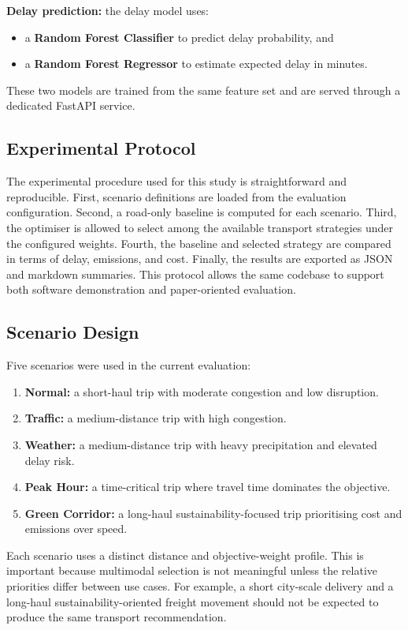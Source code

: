 \textbf{Delay prediction:} the delay model uses:
\begin{itemize}
    \item a \textbf{Random Forest Classifier} to predict delay probability, and
    \item a \textbf{Random Forest Regressor} to estimate expected delay in minutes.
\end{itemize}
These two models are trained from the same feature set and are served through a dedicated FastAPI service.

\subsection{Experimental Protocol}
The experimental procedure used for this study is straightforward and reproducible. First, scenario definitions are loaded from the evaluation configuration. Second, a road-only baseline is computed for each scenario. Third, the optimiser is allowed to select among the available transport strategies under the configured weights. Fourth, the baseline and selected strategy are compared in terms of delay, emissions, and cost. Finally, the results are exported as JSON and markdown summaries. This protocol allows the same codebase to support both software demonstration and paper-oriented evaluation.

\subsection{Scenario Design}
Five scenarios were used in the current evaluation:
\begin{enumerate}
    \item \textbf{Normal:} a short-haul trip with moderate congestion and low disruption.
    \item \textbf{Traffic:} a medium-distance trip with high congestion.
    \item \textbf{Weather:} a medium-distance trip with heavy precipitation and elevated delay risk.
    \item \textbf{Peak Hour:} a time-critical trip where travel time dominates the objective.
    \item \textbf{Green Corridor:} a long-haul sustainability-focused trip prioritising cost and emissions over speed.
\end{enumerate}

Each scenario uses a distinct distance and objective-weight profile. This is important because multimodal selection is not meaningful unless the relative priorities differ between use cases. For example, a short city-scale delivery and a long-haul sustainability-oriented freight movement should not be expected to produce the same transport recommendation.

